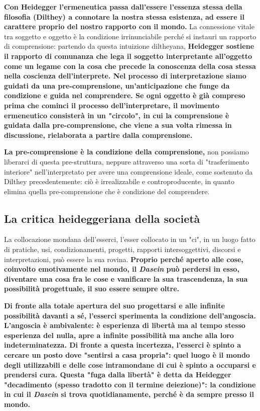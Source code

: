 \textbf{Con Heidegger l'ermeneutica passa dall'essere
l'essenza stessa della filosofia (Dilthey) a
connotare la nostra stessa esistenza, ad essere
il carattere proprio del nostro rapporto con il
mondo.}
La connessione vitale tra soggetto e oggetto è la
condizione irrinunciabile perché si instauri un
rapporto di comprensione: partendo da questa
intuizione diltheyana,\textbf{ Heidegger sostiene 
il rapporto di comunanza che lega
il soggetto interpretante all'oggetto come
un legame con la cosa che precede la
conoscenza della cosa stessa nella coscienza
dell'interprete. Nel processo di interpretazione
siamo guidati da una pre-comprensione,
un'anticipazione che funge da condizione e guida
nel comprendere.
Se ogni oggetto è già compreso prima che cominci il
processo dell'interpretare, il movimento ermeneutico
consisterà in un "circolo", in cui la comprensione
è guidata dalla pre-comprensione, che viene
a sua volta rimessa in discussione, rielaborata
a partire dalla comprensione.}

\textbf{La pre-comprensione è la condizione della comprensione,}
non possiamo liberarci di questa pre-struttura, neppure
attraverso una sorta di  "trasferimento interiore"
nell'interpretato per avere una comprensione
ideale, come sostenuto da Dilthey precedentemente:
ciò è irrealizzabile e controproducente, in
quanto elimina quella pre-comprensione che è
condizione del comprendere.

\subsection{La critica heideggeriana della società}

La collocazione mondana dell'esserci, l'esser collocato
in un "ci", in un luogo fatto di pratiche,
usi, condizionamenti, progetti, rapporti intersoggettivi,
discorsi e interpretazioni, può essere la sua rovina.
\textbf{Proprio perché aperto alle cose, coinvolto
emotivamente nel mondo, il \textit{Dasein} può
perdersi in esso, diventare una cosa fra le cose e
vanificare la sua trascendenza, la sua possibilità
progettuale, il suo essere sempre oltre.}

\textbf{Di fronte alla totale apertura del suo progettarsi e
alle infinite possibilità davanti a sé, l'esserci sperimenta
la condizione dell'angoscia. L'angoscia è ambivalente:
è esperienza di libertà ma al tempo stesso esperienza del
nulla, apre a infinite possibilità ma anche alla loro
indeterminatezza. Di fronte a questa incertezza,
l'esserci è spinto a cercare un posto dove "sentirsi
a casa propria": quel luogo è il mondo degli
utilizzabili e delle cose intramondane di cui è
spinto a occuparsi e prendersi cura.
Questa "fuga dalla libertà" è detta da Heidegger
"decadimento (spesso tradotto con il termine deiezione)":
la condizione in cui il \textit{Dasein} si trova quotidianamente, perché è da sempre presso il mondo.} 

